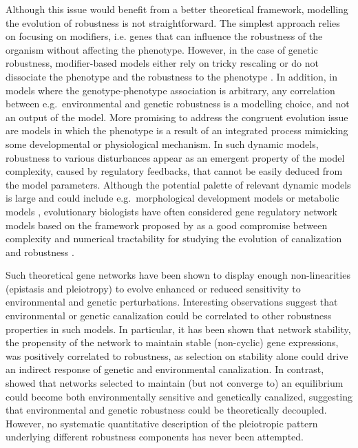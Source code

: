 \documentclass[10pt,a4paper]{article}
\begin{document}
Although this issue would benefit from a better theoretical framework, modelling the evolution of robustness is not straightforward. The simplest approach relies on focusing on modifiers, i.e. genes that can influence the robustness of the organism without affecting the phenotype. However, in the case of genetic robustness, modifier-based models either rely on tricky rescaling or do not dissociate the phenotype and the robustness to the phenotype \citep{WBB97, Kaw00, RM13}. In addition, in models where the genotype-phenotype association is arbitrary, any correlation between e.g.\ environmental and genetic robustness is a modelling choice, and not an output of the model. More promising to address the congruent evolution issue are models in which the phenotype is a result of an integrated process mimicking some developmental or physiological mechanism. In such dynamic models, robustness to various disturbances appear as an emergent property of the model complexity, caused by regulatory feedbacks, that cannot be easily deduced from the model parameters. Although the potential palette of relevant dynamic models is large and could include e.g.\ morphological development models \citep{MS20} or metabolic models \citep{NBR19}, evolutionary biologists have often considered gene regulatory network models based on the framework proposed by \citealp{Wag94} as a good compromise between complexity and numerical tractability for studying the evolution of canalization and robustness \citep{LP12}.

Such theoretical gene networks have been shown to display enough non-linearities (epistasis and pleiotropy) to evolve enhanced or reduced sensitivity to environmental \citep{Mas04,EMW11,EMW11b} and genetic \citep{Wag96,BS03,DW08,ALS+06,RL16} perturbations. Interesting observations suggest that environmental or genetic canalization could be correlated to other robustness properties in such models. In particular, it has been shown that network stability, the propensity of the network to maintain stable (non-cyclic) gene expressions, was positively correlated to robustness, as selection on stability alone could drive an indirect response of genetic \citep{SB02} and environmental \citep{Mas04} canalization. In contrast, \citealp{ORL18} showed that networks selected to maintain (but not converge to) an equilibrium could become both environmentally sensitive and genetically canalized, suggesting that environmental and genetic robustness could be theoretically decoupled. However, no systematic quantitative description of the pleiotropic pattern underlying different robustness components has never been attempted. 
\end{document}
